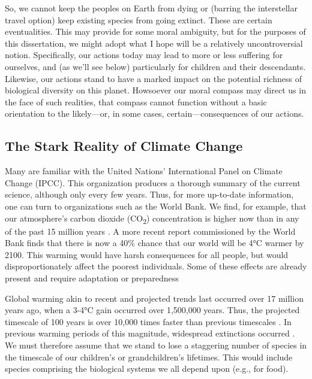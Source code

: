 So, we cannot keep the peoples on Earth from dying or (barring the interstellar
travel option) keep existing species from
going extinct. These are certain eventualities. This may provide for some moral
ambiguity, but for the purposes of this dissertation, we might adopt what I hope
will be a relatively uncontroversial notion. Specifically, our actions today may
lead to more or less suffering for ourselves, and (as we'll see below)
particularly for children and their descendants. Likewise, our actions stand
to have a marked impact on the potential richness of biological diversity on
this planet.  Howsoever our moral compass may direct us in the face of such
realities, that compass cannot function without a basic orientation to the
likely---or, in some cases, certain---consequences of our actions.

\subsection{The Stark Reality of Climate Change}


Many are familiar with the United Nations' International Panel on Climate Change
(IPCC). This organization produces a thorough summary of the current science,
although only every few years. Thus, for more up-to-date information, one can
turn to organizations such as the World Bank. We find, for example, that our
atmosphere's carbon dioxide (CO\textsubscript{2}) concentration is higher now
than in any of the past 15 million years \parencite{world_bank_turn_2012}.  A
more recent report commissioned by the World Bank
\parencite{potsdam_institute_for_climate_impact_research_and_climate_analytics_turn_2013}
finds that there is now a 40\% chance that our world will be 4°C warmer by 2100.
This warming would have harsh consequences for all people, but would
disproportionately affect the poorest individuals.  Some of these effects are
already present and require adaptation or preparedness

Global warming akin to recent and projected trends last occurred over 17 million
years ago, when a 3-4°C gain occurred over 1,500,000 years. Thus, the projected
timescale of 100 years is over 10,000 times faster than previous timescales
\parencite{barnosky_heatstroke:_2009}. In previous warming periods of this
magnitude, widespread extinctions occurred \parencite{mayhew_long-term_2008}. We
must therefore assume that we stand to lose a staggering number of species in
the timescale of our children's or grandchildren's lifetimes. This would include
species comprising the biological systems we all depend upon (e.g., for food).

